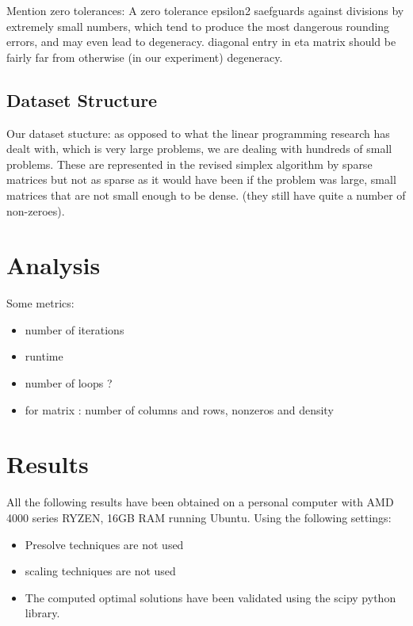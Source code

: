 Mention zero tolerances: A zero tolerance epsilon2 saefguards against divisions
by extremely small numbers, which tend to produce the most dangerous rounding errors, and 
may even lead to degeneracy. diagonal entry in eta matrix should be fairly far from
 otherwise (in our experiment) degeneracy.
\subsection{Dataset Structure}
Our dataset stucture:
as opposed to what the linear programming research has dealt with, which is
very large problems, we are dealing with hundreds of small problems. These are represented
in the revised simplex algorithm by
sparse matrices but not as sparse as it would have been if the problem was large,
small matrices that are not small enough to be dense.
(they still have quite a number of non-zeroes).

\section{Analysis}
Some metrics:
\begin{itemize}
    \item number of iterations
    \item runtime
    \item number of loops ?
    \item for matrix : number of columns and rows, nonzeros and density
\end{itemize}

\section{Results}
All the following results have been obtained on a personal computer with AMD 4000 series
RYZEN, 16GB RAM running Ubuntu. Using the following settings:
\begin{itemize}
    \item Presolve techniques are not used
    \item scaling techniques are not used
    \item The computed optimal solutions have been validated using the scipy python library.
\end{itemize}